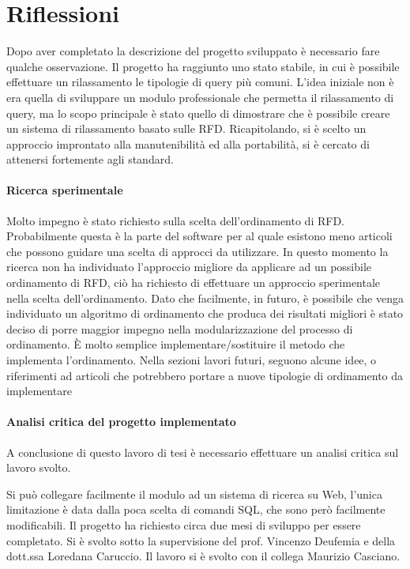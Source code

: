 \section{Riflessioni}
Dopo aver completato la descrizione del progetto sviluppato è necessario fare qualche osservazione.
Il progetto ha raggiunto uno stato stabile, in cui è possibile effettuare un rilassamento le tipologie di query più comuni. 
L'idea iniziale non è era quella di sviluppare un modulo professionale che permetta il rilassamento di query, ma lo scopo principale è stato quello di dimostrare che è possibile creare un sistema di rilassamento basato sulle RFD.
Ricapitolando, si è scelto un approccio improntato alla manutenibilità ed alla portabilità, si è cercato di attenersi fortemente agli standard. 

\paragraph{Ricerca sperimentale}
Molto impegno è stato richiesto sulla scelta dell'ordinamento di RFD. Probabilmente questa è la parte del software per al quale esistono meno articoli che possono guidare una scelta di approcci da utilizzare. In questo momento la ricerca non ha individuato l'approccio migliore da applicare ad un possibile ordinamento di RFD, ciò ha richiesto di effettuare un approccio sperimentale nella scelta dell'ordinamento.
Dato che facilmente, in futuro, è possibile che venga individuato un algoritmo di ordinamento che produca dei risultati migliori è stato deciso di porre maggior impegno nella modularizzazione del processo di ordinamento. È molto semplice implementare/sostituire il metodo che implementa l'ordinamento.
Nella sezioni lavori futuri, seguono alcune idee, o riferimenti ad articoli che potrebbero portare a nuove tipologie di ordinamento da implementare

\paragraph{Analisi critica del progetto implementato}
A conclusione di questo lavoro di tesi è necessario effettuare un analisi critica sul lavoro svolto.




Si può collegare facilmente il modulo ad un sistema di ricerca su Web, l'unica limitazione è data dalla poca scelta di comandi SQL, che sono però facilmente modificabili.
Il progetto ha richiesto circa due mesi di sviluppo per essere completato. Si è svolto sotto la supervisione del prof. Vincenzo Deufemia e della dott.ssa Loredana Caruccio. Il lavoro si è svolto con il collega Maurizio Casciano.


